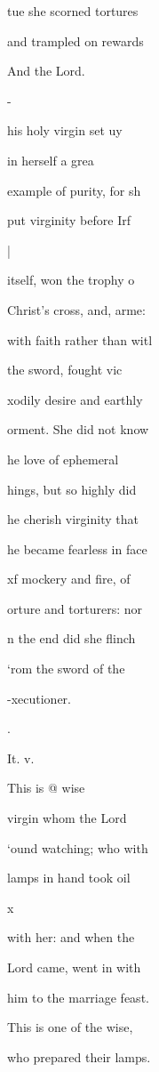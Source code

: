 \documentclass{breviary}
\begin{document}
\begin{brevbody}
tue she scorned tortures

and trampled on rewards

And the Lord.

-

his holy virgin set uy

in herself a grea

example of purity, for sh

put virginity before Irf

\begin{rubricpar}
|

\end{rubricpar}
itself, won the trophy o

Christ’s cross, and, arme:

with faith rather than witl

the sword, fought vic

\blackrule
\blackrule
xodily desire and earthly

orment. She did not know

he love of ephemeral

hings, but so highly did

he cherish virginity that

he became fearless in face

xf mockery and fire, of

orture and torturers: nor

n the end did she flinch

‘rom the sword of the

-xecutioner.

.

\begin{rubricpar}
It. v.

\end{rubricpar}
This is @ wise

virgin whom the Lord

‘ound watching; who with

lamps in hand took oil

\begin{rubricpar}
x

\end{rubricpar}
with her: and when the

Lord came, went in with

him to the marriage feast.

\vers{} This is one of the wise,

who prepared their lamps.


\end{brevbody}
\end{document}
